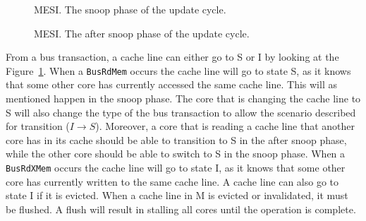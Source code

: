 \begin{figure}[H]
    \centering
    \caption{MESI. The snoop phase of the update cycle.}
    \label{fig:mesi_snoop}
\end{figure}







\begin{figure}[H]
    \centering
    \caption{MESI. The after snoop phase of the update cycle.}
    \label{fig:mesi_after_snoop}
\end{figure}

From a bus transaction, a cache line can either go to S or I by looking at the Figure~\ref{fig:mesi_snoop}.
When a \texttt{BusRdMem} occurs the cache line will go to state S, as it knows that some other core has currently accessed the same cache line.
This will as mentioned happen in the snoop phase.
The core that is changing the cache line to S will also change the type of the bus transaction to allow the scenario described for transition ($I \to S$).
Moreover, a core that is reading a cache line that another core has in its cache should be able to transition to S in the after snoop phase, while the other core should be able to switch to S in the snoop phase.
When a \texttt{BusRdXMem} occurs the cache line will go to state I, as it knows that some other core has currently written to the same cache line.
A cache line can also go to state I if it is evicted.
When a cache line in M is evicted or invalidated, it must be flushed.
A flush will result in stalling all cores until the operation is complete.


